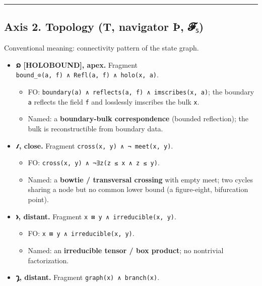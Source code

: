 \documentclass[12pt,a4paper]{article}
\begin{document}
\begin{center}\rule{0.5\linewidth}{0.5pt}\end{center}

\hypertarget{axis-2.-topology-t-navigator-uxfe-ux1d4d5ux2085}{%
\subsection{Axis 2. Topology (T, navigator Þ,
𝓕₅)}\label{axis-2.-topology-t-navigator-uxfe-ux1d4d5ux2085}}

Conventional meaning: connectivity pattern of the state graph.

\begin{itemize}
\tightlist
\item
  \textbf{𐑸 {[}HOLOBOUND{]}, apex.} Fragment
  \texttt{bound\_⊙(a,\ f)\ ∧\ Refl(a,\ f)\ ∧\ holo(x,\ a)}.

  \begin{itemize}
  \tightlist
  \item
    FO: \texttt{boundary(a)\ ∧\ reflects(a,\ f)\ ∧\ imscribes(x,\ a)};
    the boundary \texttt{a} reflects the field \texttt{f} and losslessly
    imscribes the bulk \texttt{x}.
  \item
    Named: a \textbf{boundary-bulk correspondence} (bounded reflection);
    the bulk is reconstructible from boundary data.
  \end{itemize}
\item
  \textbf{𐑥, close.} Fragment \texttt{cross(x,\ y)\ ∧\ ¬\ meet(x,\ y)}.

  \begin{itemize}
  \tightlist
  \item
    FO: \texttt{cross(x,\ y)\ ∧\ ¬∃z(z\ ≤\ x\ ∧\ z\ ≤\ y)}.
  \item
    Named: a \textbf{bowtie / transversal crossing} with empty meet; two
    cycles sharing a node but no common lower bound (a figure-eight,
    bifurcation point).
  \end{itemize}
\item
  \textbf{𐑶, distant.} Fragment \texttt{x\ ⊠\ y\ ∧\ irreducible(x,\ y)}.

  \begin{itemize}
  \tightlist
  \item
    FO: \texttt{x\ ⊠\ y\ ∧\ irreducible(x,\ y)}.
  \item
    Named: an \textbf{irreducible tensor / box product}; no nontrivial
    factorization.
  \end{itemize}
\item
  \textbf{𐑡, distant.} Fragment \texttt{graph(x)\ ∧\ branch(x)}.


\end{itemize}
\end{document}
